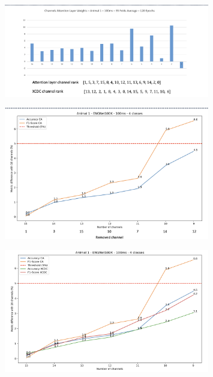 \documentclass{Configuration_Files/PoliMi3i_thesis}
\begin{document}
\begin{figure}[H]
    \centering
    \includegraphics[width=0.8\textwidth]{Results Matteo/figure10}
    \label{fig:figure1}
\end{figure}

\begin{figure}[H]
    \centering
    \includegraphics[width=0.8\textwidth]{Results Matteo/figure11}
    \label{fig:figure1}
\end{figure}

\begin{figure}[H]
    \centering
    \includegraphics[width=0.8\textwidth]{Results Matteo/figure12}
    \label{fig:figure1}
\end{figure}
\end{document}
